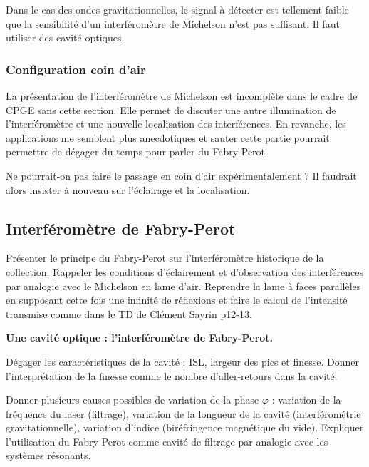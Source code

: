\begin{transition}
Dans le cas des ondes gravitationnelles, le signal à détecter est tellement faible que la sensibilité d'un interféromètre de Michelson n'est pas suffisant.
Il faut utiliser des cavité optiques.
\end{transition}

\subsubsection{Configuration coin d'air}

\begin{remarque}
La présentation de l'interféromètre de Michelson est incomplète dans le cadre de CPGE sans cette section.
Elle permet de discuter une autre illumination de l'interféromètre et une nouvelle localisation des interférences.
En revanche, les applications me semblent plus anecdotiques et sauter cette partie pourrait permettre de dégager du temps pour parler du Fabry-Perot.

\noindent
Ne pourrait-on pas faire le passage en coin d'air expérimentalement ?
Il faudrait alors insister à nouveau sur l'éclairage et la localisation.
\end{remarque}

\subsection{Interféromètre de Fabry-Perot}

Présenter le principe du Fabry-Perot sur l'interféromètre historique de la collection.
Rappeler les conditions d'éclairement et d'observation des interférences par analogie avec le Michelson en lame d'air.
Reprendre la lame à faces parallèles en supposant cette fois une infinité de réflexions et faire le calcul de l'intensité transmise comme dans le TD de Clément Sayrin p12-13.

\begin{slide}
\textbf{Une cavité optique : l'interféromètre de Fabry-Perot.}
\end{slide}
Dégager les caractéristiques de la cavité : ISL, largeur des pics et finesse.
Donner l'interprétation de la finesse comme le nombre d'aller-retours dans la cavité.

Donner plusieurs causes possibles de variation de la phase $\varphi$ : variation de la fréquence du laser (filtrage), variation de la longueur de la cavité (interférométrie gravitationnelle), variation d'indice (biréfringence magnétique du vide).
Expliquer l'utilisation du Fabry-Perot comme cavité de filtrage par analogie avec les systèmes résonants.


